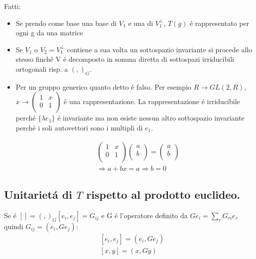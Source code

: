 \documentclass[oneside,12pt]{memoir}
\begin{document}
Fatti:
\begin{itemize}
    \item Se prendo  come base una base di $V_1$ e una di $V_1^{\perp}$, $T(g)$ \'e rappresentato per ogni g da una matrice
    
    \item Se $V_1$ o $V_2=V_1^{\perp}$ contiene a sua volta un sottospazio invariante si procede allo stesso finch\'e V \'e decomposto in somma diretta di sottospazi irriducibili ortogonali risp. a $(,)_G$.
    \item Per un gruppo generico quanto detto \'e falso. Per esempio $R\to GL(2,R)$, $x\to\begin{pmatrix}1&x\\0&1\\\end{pmatrix}$ \'e una rappresentazione. La rappresentazione \'e irriducibile perch\'e $\{\lambda e_1\}$ \'e invariante ma non esiste nessun altro sottospazio invariante perch\'e i soli autovettori sono i multipli di $e_1$.
    
\begin{align*}
    &\begin{pmatrix}1&x\\0&1\\\end{pmatrix}\begin{pmatrix}a\\b\\\end{pmatrix}=\begin{pmatrix}a\\b\\\end{pmatrix}\\
    &\Rightarrow a+bx=a\Rightarrow b=0
\end{align*}
    
\end{itemize}

\subsection{Unitariet\'a di \texorpdfstring{$T$}{T} rispetto al prodotto euclideo.}

Se \'e $[]=(,)_G[e_i,e_j]=G_{ij}$ e G \'e l'operatore definito da $Ge_i=\sum_rG_{ri}e_r$ quindi $G_{ij}=(e_i,Ge_j)$:
\begin{align*}
&[e_i,e_j]=(e_i,Ge_j)\\
&[x,y]=(x,Gy)
\end{align*}
\end{document}
